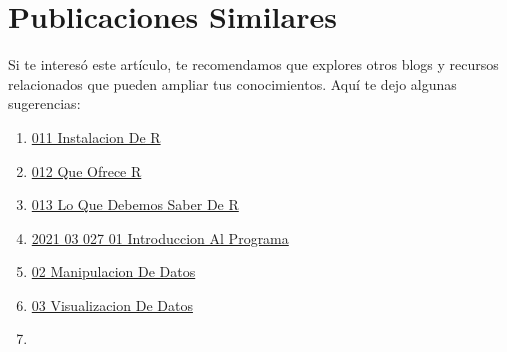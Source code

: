 \documentclass[
  jou,
  floatsintext,
  longtable,
  a4paper,
  nolmodern,
  notxfonts,
  notimes,
  colorlinks=true,linkcolor=blue,citecolor=blue,urlcolor=blue]{apa7}
\providecommand{\tightlist}{%
  \setlength{\itemsep}{0pt}\setlength{\parskip}{0pt}}
\begin{document}
\section{Publicaciones Similares}\label{publicaciones-similares}

Si te interesó este artículo, te recomendamos que explores otros blogs y
recursos relacionados que pueden ampliar tus conocimientos. Aquí te dejo
algunas sugerencias:

\begin{enumerate}
\def\labelenumi{\arabic{enumi}.}
\tightlist
\item
  \href{https://achalmaedison.netlify.app/programacion-software/r/2020-06-10-011-instalacion-de-r/index.pdf}{}
  \href{https://achalmaedison.netlify.app/programacion-software/r/2020-06-10-011-instalacion-de-r}{011
  Instalacion De R}
\item
  \href{https://achalmaedison.netlify.app/programacion-software/r/2020-06-10-012-que-ofrece-r/index.pdf}{}
  \href{https://achalmaedison.netlify.app/programacion-software/r/2020-06-10-012-que-ofrece-r}{012
  Que Ofrece R}
\item
  \href{https://achalmaedison.netlify.app/programacion-software/r/2020-06-10-013-lo-que-debemos-saber-de-r/index.pdf}{}
  \href{https://achalmaedison.netlify.app/programacion-software/r/2020-06-10-013-lo-que-debemos-saber-de-r}{013
  Lo Que Debemos Saber De R}
\item
  \href{https://achalmaedison.netlify.app/programacion-software/r/2021-03-027-01-introduccion-al-programa/index.pdf}{}
  \href{https://achalmaedison.netlify.app/programacion-software/r/2021-03-027-01-introduccion-al-programa}{2021
  03 027 01 Introduccion Al Programa}
\item
  \href{https://achalmaedison.netlify.app/programacion-software/r/2021-04-05-02-manipulacion-de-datos/index.pdf}{}
  \href{https://achalmaedison.netlify.app/programacion-software/r/2021-04-05-02-manipulacion-de-datos}{02
  Manipulacion De Datos}
\item
  \href{https://achalmaedison.netlify.app/programacion-software/r/2021-04-12-03-visualizacion-de-datos/index.pdf}{}
  \href{https://achalmaedison.netlify.app/programacion-software/r/2021-04-12-03-visualizacion-de-datos}{03
  Visualizacion De Datos}
\item
  \href{https://achalmaedison.netlify.app/programacion-software/r/2022-11-07-04-modelo-de-machine-learning-i-analisis-exploratorio/index.pdf}{}

\end{enumerate}
\end{document}
